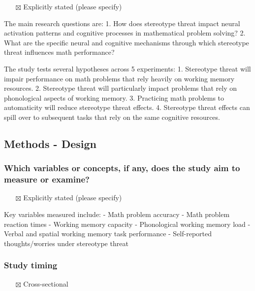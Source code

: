 \documentclass[
  doc, a4paper]{apa7}
\providecommand{\tightlist}{%
  \setlength{\itemsep}{0pt}\setlength{\parskip}{0pt}}
\begin{document}
\begin{itemize}
\tightlist
\item[$\boxtimes$]
  Explicitly stated (please specify)
\end{itemize}

The main research questions are:
1. How does stereotype threat impact neural activation patterns and cognitive processes in mathematical problem solving?
2. What are the specific neural and cognitive mechanisms through which stereotype threat influences math performance?

The study tests several hypotheses across 5 experiments:
1. Stereotype threat will impair performance on math problems that rely heavily on working memory resources.
2. Stereotype threat will particularly impact problems that rely on phonological aspects of working memory.
3. Practicing math problems to automaticity will reduce stereotype threat effects.
4. Stereotype threat effects can spill over to subsequent tasks that rely on the same cognitive resources.

\subsection{Methods - Design}\label{methods---design}

\subsubsection{Which variables or concepts, if any, does the study aim to measure or examine?}\label{which-variables-or-concepts-if-any-does-the-study-aim-to-measure-or-examine}

\begin{itemize}
\tightlist
\item[$\boxtimes$]
  Explicitly stated (please specify)
\end{itemize}

Key variables measured include:
- Math problem accuracy
- Math problem reaction times
- Working memory capacity
- Phonological working memory load
- Verbal and spatial working memory task performance
- Self-reported thoughts/worries under stereotype threat

\subsubsection{Study timing}\label{study-timing}

\begin{itemize}
\tightlist
\item[$\boxtimes$]
  Cross-sectional
\end{itemize}
\end{document}
